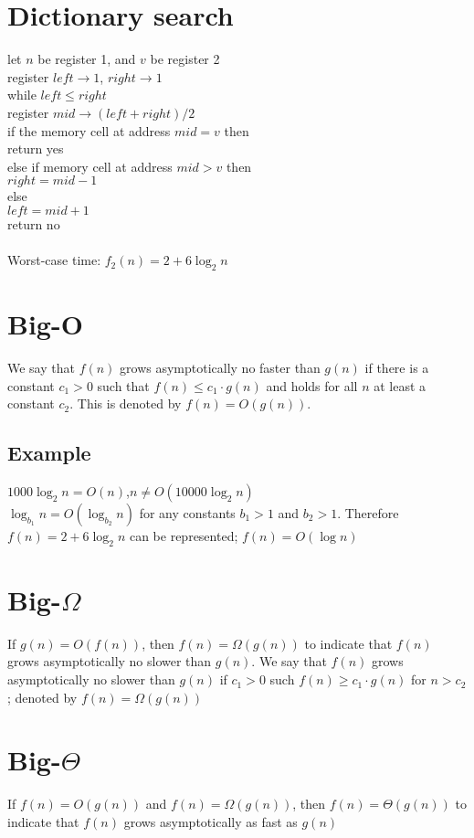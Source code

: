 \documentclass[5pt,a4paper]{article}
\begin{document}
\begin{multicols}{3}
\section{Dictionary search}
let $n$ be register 1, and $v$ be register 2\\
register $left\rightarrow1$, $right\rightarrow1$\\
while $left\leq right$\\
\indent register $mid\rightarrow(left+right)/2$\\
\indent if the memory cell at address $mid=v$ then\\
\indent\indent return yes\\
\indent else if memory cell at address $mid>v$ then\\
\indent\indent $right=mid-1$\\
\indent else\\
\indent\indent $left=mid+1$\\
return no\\\\
Worst-case time: $f_2(n)=2+6\log_2n$

\section{Big-O}
We say that $f(n)$ grows asymptotically no faster than $g(n)$ if there is a constant $c_1>0$ such that $f(n)\leq c_1\cdot g(n)$ and holds for all $n$ at least a constant $c_2$. This is denoted by $f(n)=O(g(n))$.
\subsection{Example}
$1000\log_2n=O(n)$,$n\neq O(10000\log_2n)$\\
$\log_{b_1}n=O(\log_{b_2}n)$ for any constants $b_1>1$ and $b_2>1$.
Therefore $f(n)=2+6\log_2n$ can be represented; $f(n)=O(\log n)$
\section{Big-$\Omega$}
If $g(n)=O(f(n))$, then $f(n)=\Omega(g(n))$ to indicate that $f(n)$ grows asymptotically no slower than $g(n)$. We say that $f(n)$ grows asymptotically no slower than $g(n)$ if $c_1>0$ such $f(n)\geq c_1\cdot g(n)$ for $n>c_2$; denoted by $f(n)=\Omega(g(n))$
\section{Big-$\Theta$}
If $f(n)=O(g(n))$ and $f(n)=\Omega(g(n))$, then $f(n)=\Theta(g(n))$ to indicate that $f(n)$ grows asymptotically as fast as $g(n)$

\end{multicols}
\end{document}
